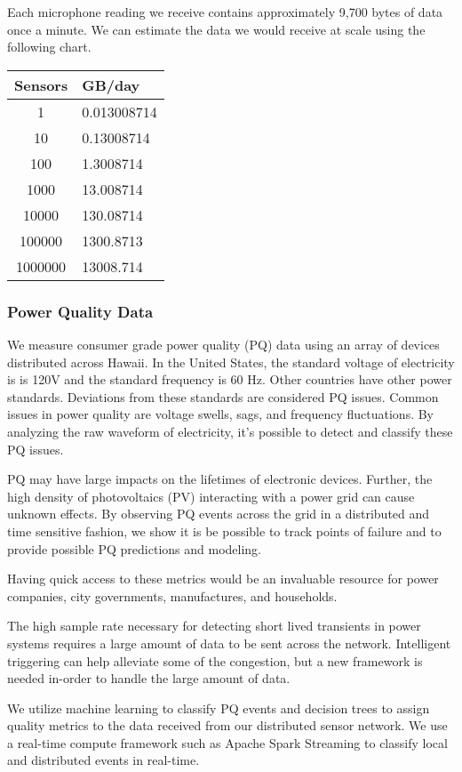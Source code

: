 Each microphone reading we receive contains approximately 9,700 bytes of data once a minute. We can estimate the data we would receive at scale using the following chart.

\begin{tabular}{| c | l |}\hline
Sensors & GB/day \\\hline
1 & 0.013008714 \\\hline
10 & 0.13008714 \\\hline
100 & 1.3008714 \\\hline
1000 & 13.008714 \\\hline
10000 & 130.08714 \\\hline
100000 & 1300.8713 \\\hline
1000000 & 13008.714 \\\hline
\end{tabular}

\subsubsection{Power Quality Data}
We measure consumer grade power quality (PQ) data using an array of devices distributed across Hawaii. In the United States, the standard voltage of electricity is is 120V and the standard frequency is 60 Hz. Other countries have other power standards. Deviations from these standards are considered PQ issues. Common issues in power quality are voltage swells, sags, and frequency fluctuations. By analyzing the raw waveform of electricity, it's possible to detect and classify these PQ issues. 

PQ may have large impacts on the lifetimes of electronic devices. Further, the high density of photovoltaics (PV) interacting with a power grid can cause unknown effects. By observing PQ events across the grid in a distributed and time sensitive fashion, we show it is be possible to track points of failure and to provide possible PQ predictions and modeling.

Having quick access to these metrics would be an invaluable resource for power companies, city governments, manufactures, and households.

The high sample rate necessary for detecting short lived transients in power systems requires a large amount of data to be sent across the network. Intelligent triggering can help alleviate some of the congestion, but a new framework is needed in-order to handle the large amount of data.

We utilize machine learning to classify PQ events and decision trees to assign quality metrics to the data received from our distributed sensor network. We use a real-time compute framework such as Apache Spark Streaming to classify local and distributed events in real-time.


